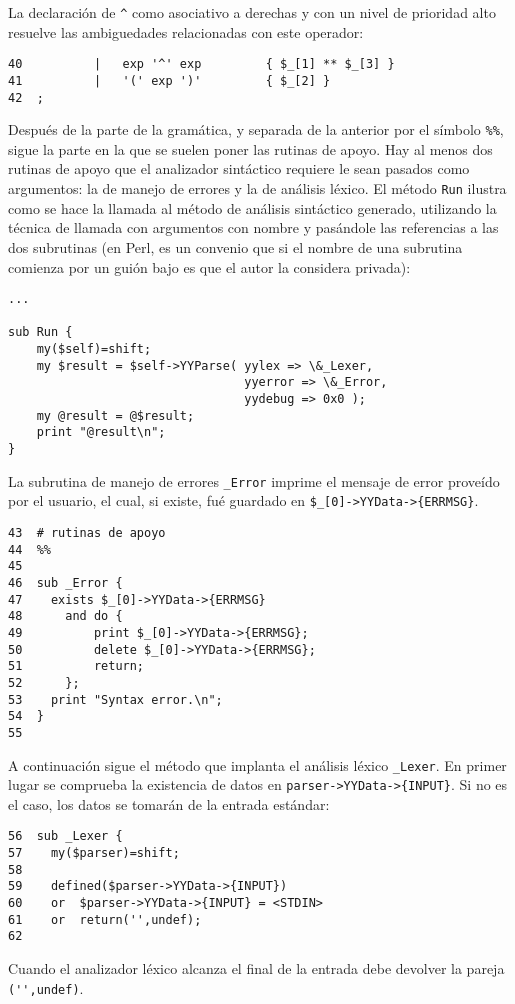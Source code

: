 La declaración de \verb|^| como asociativo a derechas y con un nivel
de prioridad alto resuelve las ambiguedades relacionadas 
con este operador:

\begin{verbatim}
40          |   exp '^' exp         { $_[1] ** $_[3] }
41          |   '(' exp ')'         { $_[2] }
42  ;
\end{verbatim}

Después de la parte de la gramática, y separada de la anterior
por el símbolo \verb|%%|, sigue la parte en la que se 
suelen poner las rutinas de apoyo. Hay al menos dos rutinas de apoyo que 
el analizador sintáctico requiere le sean pasados como argumentos: 
la de manejo de errores y la de análisis léxico. El método \verb|Run|
ilustra como se hace la llamada al método de análisis sintáctico 
generado, utilizando la técnica de llamada con argumentos con nombre 
y pasándole las referencias a las dos subrutinas (en Perl,
es un convenio que si el nombre de una subrutina comienza
por un guión bajo es que el autor la considera privada):
\begin{verbatim}
...

sub Run {
    my($self)=shift;
    my $result = $self->YYParse( yylex => \&_Lexer, 
                                 yyerror => \&_Error,
                                 yydebug => 0x0 );
    my @result = @$result;
    print "@result\n";
}
\end{verbatim}

La subrutina de manejo de errores \verb|_Error| imprime 
el mensaje de error proveído por el usuario, el cual, si existe, fué guardado en
\verb|$_[0]->YYData->{ERRMSG}|.
\begin{verbatim}
43  # rutinas de apoyo 
44  %%
45  
46  sub _Error {
47    exists $_[0]->YYData->{ERRMSG}
48      and do {
49          print $_[0]->YYData->{ERRMSG};
50          delete $_[0]->YYData->{ERRMSG};
51          return;
52      };
53    print "Syntax error.\n";
54  }
55  
\end{verbatim}
A continuación sigue el método que implanta
el  análisis léxico \verb|_Lexer|.
En primer lugar se comprueba la existencia de
datos en \verb|parser->YYData->{INPUT}|. Si no es el caso, los datos
se tomarán de la entrada estándar:
\begin{verbatim}
56  sub _Lexer {
57    my($parser)=shift;
58  
59    defined($parser->YYData->{INPUT})
60    or  $parser->YYData->{INPUT} = <STDIN>
61    or  return('',undef);
62  
\end{verbatim}
Cuando el analizador léxico alcanza el final de la entrada
debe devolver la pareja \verb|('',undef)|.

